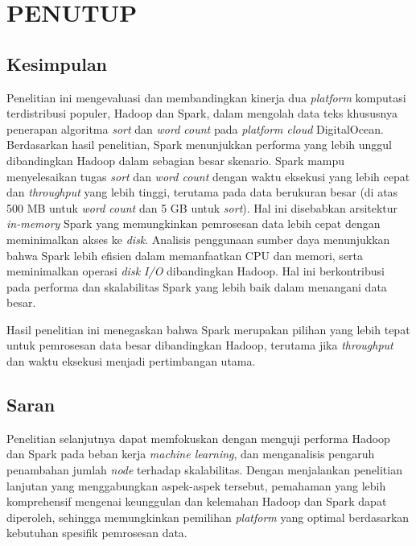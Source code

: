 \chapter{PENUTUP}

\section{Kesimpulan}
Penelitian ini mengevaluasi dan membandingkan kinerja dua \textit{platform} komputasi terdistribusi populer, Hadoop dan Spark, dalam mengolah data teks khususnya penerapan algoritma \textit{sort} dan \textit{word count} pada \textit{platform cloud} DigitalOcean. Berdasarkan hasil penelitian, Spark menunjukkan performa yang lebih unggul dibandingkan Hadoop dalam sebagian besar skenario. Spark mampu menyelesaikan tugas \textit{sort} dan \textit{word count} dengan waktu eksekusi yang lebih cepat dan \textit{throughput} yang lebih tinggi, terutama pada data berukuran besar (di atas 500 MB untuk \textit{word count} dan 5 GB untuk \textit{sort}). Hal ini disebabkan arsitektur \textit{in-memory} Spark yang memungkinkan pemrosesan data lebih cepat dengan meminimalkan akses ke \textit{disk}. Analisis penggunaan sumber daya menunjukkan bahwa Spark lebih efisien dalam memanfaatkan CPU dan memori, serta meminimalkan operasi \textit{disk I/O} dibandingkan Hadoop.  Hal ini berkontribusi pada performa dan skalabilitas Spark yang lebih baik dalam menangani data besar. 

Hasil penelitian ini menegaskan bahwa Spark merupakan pilihan yang lebih tepat untuk pemrosesan data besar dibandingkan Hadoop, terutama jika \textit{throughput} dan waktu eksekusi menjadi pertimbangan utama. 

\section{Saran}
Penelitian selanjutnya dapat memfokuskan dengan menguji performa Hadoop dan Spark pada beban kerja \textit{machine learning}, dan menganalisis pengaruh penambahan jumlah \textit{node} terhadap skalabilitas. Dengan menjalankan penelitian lanjutan yang menggabungkan aspek-aspek tersebut, pemahaman yang lebih komprehensif mengenai keunggulan dan kelemahan Hadoop dan Spark dapat diperoleh, sehingga memungkinkan pemilihan \textit{platform} yang optimal berdasarkan kebutuhan spesifik pemrosesan data.